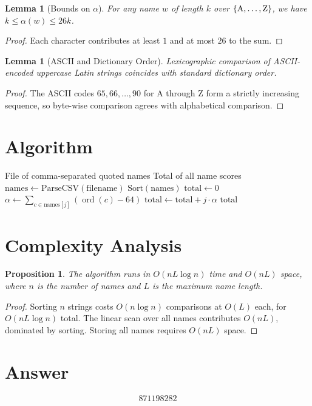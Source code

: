 \documentclass[12pt,a4paper]{article}
\newtheorem{lemma}[theorem]{Lemma}
\newtheorem{proposition}[theorem]{Proposition}
\theoremstyle{definition}
\begin{document}
\begin{lemma}[Bounds on $\alpha$]
For any name $w$ of length $k$ over $\{\textup{A}, \ldots, \textup{Z}\}$, we have $k \leq \alpha(w) \leq 26k$.
\end{lemma}

\begin{proof}
Each character contributes at least $1$ and at most $26$ to the sum.
\end{proof}

\begin{lemma}[ASCII and Dictionary Order]
Lexicographic comparison of ASCII-encoded uppercase Latin strings coincides with standard dictionary order.
\end{lemma}

\begin{proof}
The ASCII codes $65, 66, \ldots, 90$ for A through Z form a strictly increasing sequence, so byte-wise comparison agrees with alphabetical comparison.
\end{proof}

\section{Algorithm}

\begin{algorithm}[H]
\caption{Total Name Scores}
\begin{algorithmic}[1]
\REQUIRE File of comma-separated quoted names
\ENSURE Total of all name scores
\STATE $\mathrm{names} \gets \text{ParseCSV}(\text{filename})$
\STATE $\text{Sort}(\mathrm{names})$
\STATE $\mathrm{total} \gets 0$
    \STATE $\alpha \gets \sum_{c \in \mathrm{names}[j]} (\operatorname{ord}(c) - 64)$
    \STATE $\mathrm{total} \gets \mathrm{total} + j \cdot \alpha$
\ENDFOR
\RETURN $\mathrm{total}$
\end{algorithmic}
\end{algorithm}

\section{Complexity Analysis}

\begin{proposition}
The algorithm runs in $O(nL\log n)$ time and $O(nL)$ space, where $n$ is the number of names and $L$ is the maximum name length.
\end{proposition}

\begin{proof}
Sorting $n$ strings costs $O(n \log n)$ comparisons at $O(L)$ each, for $O(nL \log n)$ total. The linear scan over all names contributes $O(nL)$, dominated by sorting. Storing all names requires $O(nL)$ space.
\end{proof}

\section{Answer}

\[
\boxed{871198282}
\]
\end{document}
